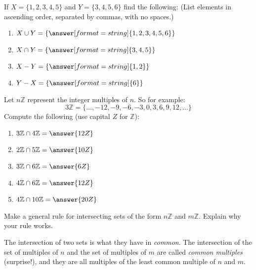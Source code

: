 \documentclass[nooutcomes]{ximera}
\renewcommand{\Z}{\mathbb Z}
\begin{document}
\begin{problem}
If $X = \{1,2,3,4,5\}$ and $Y = \{3,4,5,6\}$ find the following: (List elements in ascending order, separated by commas, with no spaces.)
\begin{enumerate}
\item $X\cup Y = \{\answer[format=string]{1,2,3,4,5,6}\}$
\item $X\cap Y = \{\answer[format=string]{3,4,5}\}$
\item $X-Y = \{\answer[format=string]{1,2}\}$
\item $Y-X = \{\answer[format=string]{6}\}$
\end{enumerate}
\end{problem}

\begin{problem}
Let $n\mathbb Z$ represent the integer multiples of $n$. So for example:
\[
3\mathbb Z = \{\dots,-12,-9,-6,-3,0,3,6,9,12,\dots\}
\]
Compute the following (use capital $Z$ for $\Z$):
\begin{enumerate}
\item $3\mathbb Z\cap 4\mathbb Z = \answer{12Z}$ 
\item $2\mathbb Z\cap 5\mathbb Z = \answer{10Z}$
\item $3\mathbb Z\cap 6\mathbb Z = \answer{6Z}$
\item $4\mathbb Z\cap 6\mathbb Z = \answer{12Z}$
\item $4\mathbb Z\cap 10\mathbb Z = \answer{20Z}$
\end{enumerate}
\end{problem}


\begin{problem}
Make a general rule for intersecting sets of the form $n\Z$ and
  $m\Z$. Explain why your rule works.
\begin{freeResponse}
\begin{hint}
The intersection of two sets is what they have in \emph{common}.  The intersection of the set of multiples of $n$ and the set of multiples of $m$ are called \emph{common multiples} (surprise!), and they are all multiples of the least common multiple of $n$ and $m$.  
\end{hint}
\end{freeResponse}
\end{problem}
\end{document}

